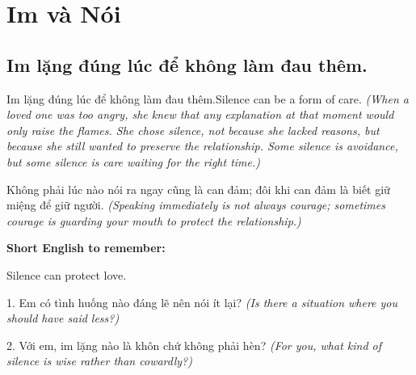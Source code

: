 \chapter{Im và Nói}

\section{Im lặng đúng lúc để không làm đau thêm.}
\begin{truyen}{Im lặng đúng lúc để không làm đau thêm.}{Silence can be a form of care.}
\textit{(When a loved one was too angry, she knew that any explanation at that moment would only raise the flames. She chose silence, not because she lacked reasons, but because she still wanted to preserve the relationship. Some silence is avoidance, but some silence is care waiting for the right time.)}
\end{truyen}
\begin{baihoc}
Không phải lúc nào nói ra ngay cũng là can đảm; đôi khi can đảm là biết giữ miệng để giữ người.
\textit{(Speaking immediately is not always courage; sometimes courage is guarding your mouth to protect the relationship.)}
\end{baihoc}
\begin{ghinhoanh}
\textbf{Short English to remember:}

Silence can protect love.
\end{ghinhoanh}
\begin{tuhocnhanh}
1. Em có tình huống nào đáng lẽ nên nói ít lại? \textit{(Is there a situation where you should have said less?)}

2. Với em, im lặng nào là khôn chứ không phải hèn? \textit{(For you, what kind of silence is wise rather than cowardly?)}
\end{tuhocnhanh}
\ngancach

